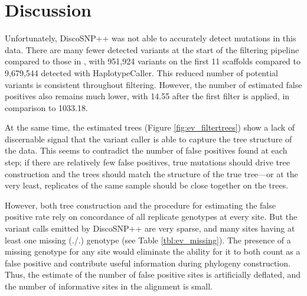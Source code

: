 \section{Discussion}

Unfortunately, DiscoSNP++ was not able to accurately detect mutations in this data. There are many fewer detected variants at the start of the filtering pipeline compared to those in \cite{orr_phylogenomic_2020}, with 951,924 variants on the first 11 scaffolds compared to 9,679,544 detected with HaplotypeCaller. This reduced number of potential variants is consistent throughout filtering. However, the number of estimated false positives also remains much lower, with 14.55 after the first filter is applied, in comparison to 1033.18.

At the same time, the estimated trees (Figure \ref{fig:ev_filtertrees}) show a lack of discernable signal that the variant caller is able to capture the tree structure of the data. This seems to contradict the number of false positives found at each step; if there are relatively few false positives, true mutations should drive tree construction and the trees should match the structure of the true tree---or at the very least, replicates of the same sample should be close together on the trees.

However, both tree construction and the procedure for estimating the false positive rate rely on concordance of all replicate genotypes at every site. But the variant calls emitted by DiscoSNP++ are very sparse, and many sites having at least one missing (./.) genotype (see Table \ref{tbl:ev_missing}). The presence of a missing genotype for any site would eliminate the ability for it to both count as a false positive and contribute useful information during phylogeny construction. Thus, the estimate of the number of false positive sites is artificially deflated, and the number of informative sites in the alignment is small. 

